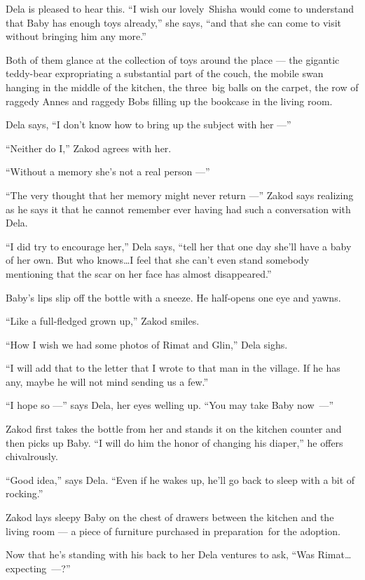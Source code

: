 \documentclass[twoside,11pt]{book}
\begin{document}
Dela is pleased to hear this. ``I wish our lovely~Shisha would come to understand that Baby has enough toys already,''
she says,
``and that she can come to visit without bringing him any more.''

Both of them glance at the collection of toys around the place --- the gigantic teddy-bear expropriating a substantial
part of the couch, the mobile swan hanging in the middle of the kitchen, the three~big balls on the carpet, the row of
raggedy Annes and raggedy Bobs filling up the bookcase in the living room.

Dela says, ``I don't know how to bring up the subject with her ---''

``Neither do I,'' Zakod agrees with her.

``Without a memory she's not a real person ---''

``The very thought that her memory might never return ---'' Zakod says realizing as he says it
that he cannot remember ever having had such a conversation with Dela.

``I did try to encourage her,'' Dela says, ``tell her that one day she'll have a
baby of her own. But who knows{\ldots}I feel that she can't even stand somebody mentioning that the scar on her face has
almost disappeared.''

Baby's lips slip off the bottle with a sneeze. He half-opens one eye and yawns.

``Like a full-fledged grown up,'' Zakod smiles.

``How I wish we had some photos of Rimat and Glin,'' Dela sighs.

``I will add that to the letter that I wrote to that man in the village. If he has any, maybe he will not
mind sending us a few.''

``I hope so ---'' says Dela, her eyes welling up.
``You may take Baby now~---''

Zakod first takes the bottle from her and stands it on the kitchen counter and then picks up Baby. ``I
will do him the honor of changing his diaper,'' he offers chivalrously.

``Good idea,'' says Dela. ``Even if he wakes up, he'll go back to sleep with a
bit of rocking.''

Zakod lays sleepy Baby on the chest of drawers between the kitchen and the living room --- a piece of furniture purchased
in preparation~for the adoption.

Now that he's standing with his back to her Dela ventures to ask, ``Was Rimat{\ldots}expecting~---?''
\end{document}
